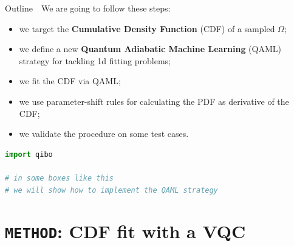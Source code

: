 \documentclass[8pt, xcolor={svgnames}, hyperref={colorlinks, linkcolor=black, citecolor=amethyst, urlcolor=amethyst}]{beamer}
\begin{document}
\begin{frame}[fragile]{Outline}
\large
\faArrowCircleRight\,\, We are going to follow these steps:
\pause
\begin{itemize}[noitemsep]
    \item[\small\faBatteryEmpty] we target the \textbf{Cumulative 
    Density Function} (CDF) of a sampled $\Omega$;
    \pause 
    \item[\small\faBatteryQuarter] we define a new \textbf{Quantum Adiabatic Machine Learning} 
    (QAML) strategy for tackling 1d fitting problems;
    \pause
    \item[\small\faBatteryHalf] we fit the CDF via QAML;
    \pause
    \item[\small\faBatteryThreeQuarters] we use parameter-shift rules for calculating 
    the PDF as derivative of the CDF; 
    \pause
    \item[\small\faBatteryFull] we validate the procedure on some test cases. 
    \pause
\end{itemize}
\vspace{0.3cm}
\begin{tcolorbox}
\begin{lstlisting}[language=Python, title=\textcolor{amethyst}{\faGithub\,\, Code here: \href{https://github.com/qiboteam/adiabatic-fit}{\texttt{qiboteam/adiabatic-fit}}}]
import qibo

# in some boxes like this
# we will show how to implement the QAML strategy
\end{lstlisting}
\end{tcolorbox}
\end{frame}

\section{\texttt{METHOD}: CDF fit with a VQC}
\end{document}
